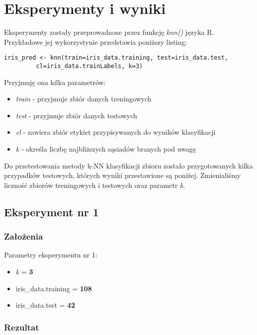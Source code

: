 \documentclass[12pt]{article}
\begin{document}
\newpage

\section{Eksperymenty i wyniki}

Eksperymenty zostały przeprowadzone przez funkcję \textit{knn()} języka R. Przykładowe jej wykorzystynie przedstawia poniższy listing:\\
{\footnotesize
\begin{lstlisting}
iris_pred <- knn(train=iris_data.training, test=iris_data.test, 
		 cl=iris_data.trainLabels, k=3)
\end{lstlisting}
}

Przyjmuję ona kilka parametrów:
\begin{itemize}
\item \textit{train} - przyjmuje zbiór danych treningowych
\item \textit{test} - przyjmuje zbiór danych testowych
\item \textit{cl} - zawiera zbiór etykiet przypisywanych do wyników klasyfikacji
\item \textit{k} - określa liczbę najbliższych sąsiadów branych pod uwagę
\end{itemize}

Do przetestowania metody k-NN klasyfikacji zbioru zostało przygotowanych kilka przypadków testowych, których wyniki przestawione są poniżej. Zmienialiśmy liczność zbiorów treningowych i testowych oraz parametr \textit{k}.

\subsection{Eksperyment nr 1}
\subsubsection{Założenia}

Parametry eksperymentu nr 1:
\begin{itemize}
\item \textit{k} = \textbf{3}
\item iris\_data.training = \textbf{108}
\item iris\_data.test = \textbf{42}
\end{itemize}

\newpage
\subsubsection{Rezultat}
\end{document}
